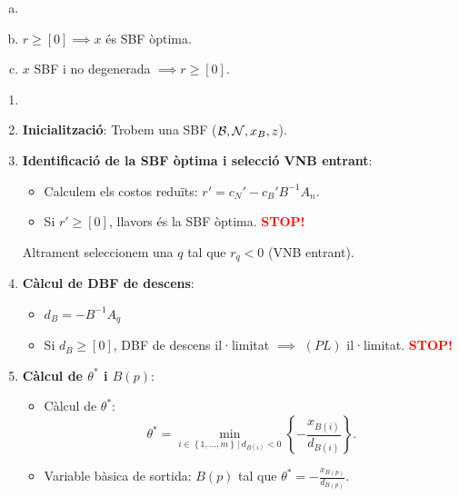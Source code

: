 \begin{teo*}
    \begin{enumerate}[a)]
        \item[]
        \item $r \geq \left[0\right] \implies x$ és SBF òptima.
        \item $x$ SBF i no degenerada $\implies r \geq \left[0\right]$.
    \end{enumerate}
\end{teo*}
\begin{alg}
    \begin{enumerate}
        \item[]
        \item {\bf Inicialització}: Trobem una SBF ($\mathcal{B}, \mathcal{N}, x_B, z$).
        \item \label{simp_pri_pas2} {\bf Identificació de la SBF òptima i selecció VNB entrant}:
            \begin{itemize}
                \item Calculem els costos reduïts: $r' = c_N' - c_B'B^{-1}A_n$.
                \item Si $r' \geq \left[0\right]$, llavors és la SBF òptima. \textcolor{red}{\bf STOP!}
            \end{itemize}
            Altrament seleccionem una $q$ tal que $r_q < 0$ (VNB entrant).
        \item {\bf Càlcul de DBF de descens}:
            \begin{itemize}
                \item $d_B = -B^{-1}A_q$
                \item Si $d_B \geq \left[0\right]$, DBF de descens il·limitat $\implies$ $\left(PL\right)$ il·limitat. \textcolor{red}{\bf STOP!}
            \end{itemize}
        \item {\bf Càlcul de $\theta^*$ i $B\left(p\right)$}:
            \begin{itemize}
                \item Càlcul de $\theta^*$: 
                    \[\theta^* = \min_{i \in \left\{ 1, \dots, m \right\} \,|\, d_{B\left(i\right)} < 0} \left\{-\frac{x_{B\left(i\right)}}{d_{B\left(i\right)}} \right\}.\]
                \item Variable bàsica de sortida: $B\left(p\right)$ tal que $\theta^* = -\frac{x_{B\left(p\right)}}{d_{B\left(p\right)}}$.
            \end{itemize}

\end{enumerate}
\end{alg}
